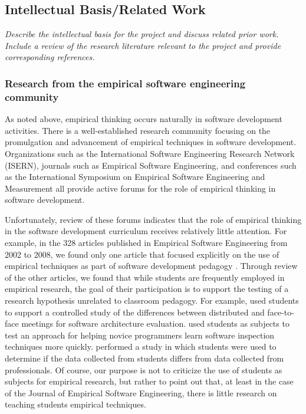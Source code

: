 \subsection{Intellectual Basis/Related Work}

{\em Describe the intellectual basis for the project and discuss related
prior work.  Include a review of the research literature relevant to the
project and provide corresponding references. }

\bigskip

\subsubsection{Research from the empirical software engineering community}

As noted above, empirical thinking occurs naturally in software development
activities.  There is a well-established research community focusing on the
promulgation and advancement of empirical techniques in software
development.  Organizations such as the International Software Engineering
Research Network (ISERN), journals such as Empirical Software Engineering,
and conferences such as the International Symposium on Empirical Software
Engineering and Measurement all provide active forums for the role of
empirical thinking in software development.

Unfortunately, review of these forums indicates that the role of empirical
thinking in the software development curriculum receives relatively little
attention.  For example, in the 328 articles published in Empirical
Software Engineering from 2002 to 2008, we found only one article that
focused explicitly on the use of empirical techniques as part of software
development pedagogy \citep{Pfahl03}.  Through review of the other articles,
we found that while students are frequently employed in empirical research,
the goal of their participation is to support the testing of a research
hypothesis unrelated to classroom pedagogy.  For example, \cite{Babar08}
used students to support a controlled study of the differences between
distributed and face-to-face meetings for software architecture evaluation.
\cite{Carver06} used students as subjects to test an approach for helping
novice programmers learn software inspection techniques more quickly.
\cite{Host00} performed a study in which students were used to determine if
the data collected from students differs from data collected from
professionals.  Of course, our purpose is not to criticize the use of
students as subjects for empirical research, but rather to point out that,
at least in the case of the Journal of Empirical Software Engineering,
there is little research on teaching students empirical techniques.

